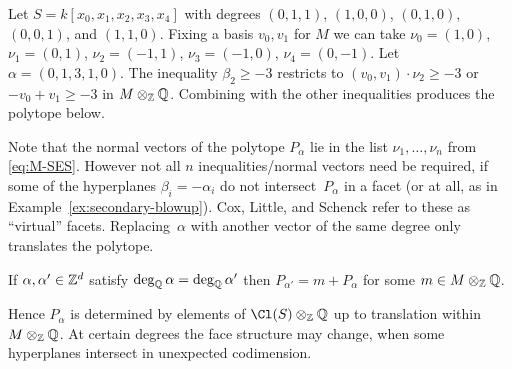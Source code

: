 \documentclass{article}
\begin{document}
\begin{example}\label{ex:secondary-blowup}
  Let $S=k[x_0,x_1,x_2,x_3,x_4]$ with degrees $(0,1,1)$, $(1,0,0)$, $(0,1,0)$, $(0,0,1)$, and $(1,1,0)$.   Fixing a basis $v_0,v_1$ for $M$ we can take $\nu_0=(1,0)$, $\nu_1=(0,1)$, $\nu_2=(-1,1)$, $\nu_3=(-1,0)$, $\nu_4=(0,-1)$.  Let $\alpha=(0,1,3,1,0)$.  The inequality $\beta_2\geq -3$ restricts to $(v_0,v_1)\cdot\nu_2\geq -3$ or $-v_0+v_1\geq -3$ in $M\otimes_\mathbb Z\mathbb Q$.  Combining with the other inequalities produces the polytope below.
  \begin{center}
  \end{center}
\end{example}

Note that the normal vectors of the polytope $P_\alpha$ lie in the list $\nu_1,\ldots,\nu_n$ from \eqref{eq:M-SES}.  However not all $n$ inequalities/normal vectors need be required, if some of the hyperplanes $\beta_i=-\alpha_i$ do not intersect~$P_\alpha$ in a facet (or at all, as in Example~\ref{ex:secondary-blowup}).  Cox, Little, and Schenck refer to these as ``virtual'' facets.  Replacing~$\alpha$ with another vector of the same degree only translates the polytope.

\begin{lemma}  If $\alpha,\alpha'\in\mathbb Z^d$ satisfy $\deg_\mathbb Q\alpha=\deg_\mathbb Q\alpha'$ then $P_{\alpha'}=m+P_\alpha$ for some $m\in M\otimes_\mathbb Z\mathbb Q$.
\end{lemma}

Hence $P_\alpha$ is determined by elements of $\Cl(S)\otimes_\ZZ\QQ$ up to translation within $M\otimes_\mathbb Z\mathbb Q$.  At certain degrees the face structure may change, when some hyperplanes intersect in unexpected codimension.
\end{document}

